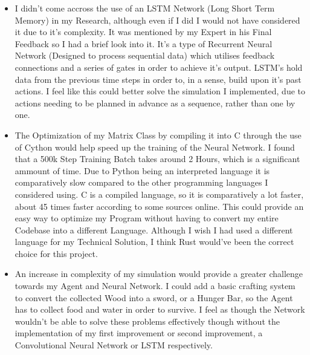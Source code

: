 \begin{flushleft}
\begin{itemize}
            \vspace{0.2cm}
            \item I didn't come accross the use of an LSTM Network (Long Short Term Memory) in my Research, although even if I did I would not have considered
            it due to it's complexity. It was mentioned by my Expert in his Final Feedback so I had a brief look into it. It's a type of Recurrent Neural Network 
            (Designed to process sequential data) which utilises feedback connections and a series of gates in order to achieve it's output. LSTM's hold 
            data from the previous time steps in order to, in a sense, build upon it's past actions. I feel like this could better solve the simulation 
            I implemented, due to actions needing to be planned in advance as a sequence, rather than one by one.
            
            \vspace{0.2cm}
            \item The Optimization of my Matrix Class by compiling it into C through the use of Cython would help speed up the training of the Neural
            Network. I found that a 500k Step Training Batch takes around 2 Hours, which is a significant ammount of time. Due to Python being an interpreted language 
            it is comparatively slow compared to the other programming languages I considered using. C is a compiled language, so it is comparatively a 
            lot faster, about 45 times faster according to some sources online. This could
            provide an easy way to optimize my Program without having to convert my entire Codebase into a different Language. Although I wish I
            had used a different language for my Technical Solution, I think Rust would've been the correct choice for this project. \\

            \vspace{0.2cm}
            \item An increase in complexity of my simulation would provide a greater challenge towards my Agent and Neural Network. I could add a basic
            crafting system to convert the collected Wood into a sword, or a Hunger Bar, so the Agent has to collect food and water in order to survive.
            I feel as though the Network wouldn't be able to solve these problems effectively though without the implementation of my first improvement
            or second improvement, a Convolutional Neural Network or LSTM respectively. \\

            \vspace{0.2cm}
        \end{itemize}
\end{flushleft}